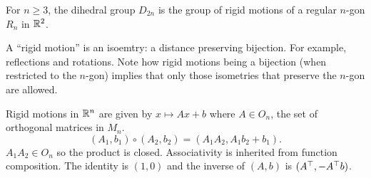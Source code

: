 \begin{definition} \label{def:groups:dihedral}
    For $n \ge 3$, the dihedral group $D_{2n}$ is the group of rigid
    motions of a regular $n$-gon $R_n$ in $\mathbb{R}^2$.
\end{definition}
\begin{remark}
    A ``rigid motion'' is an isoemtry: a distance preserving bijection.
    For example, reflections and rotations.
    Note how rigid motions being a bijection (when restricted to the
    $n$-gon) implies that only those isometries that preserve the
    $n$-gon are allowed.
\end{remark}
\begin{center}
\end{center}

Rigid motions in $\mathbb{R}^n$ are given by $x \mapsto Ax + b$ where $A \in O_n$,
the set of orthogonal matrices in $M_n$.
\[
    (A_1, b_1) \circ (A_2, b_2) = (A_1 A_2, A_1 b_2 + b_1).
\] $A_1 A_2 \in O_n$ so the product is closed.
Associativity is inherited from function composition.
The identity is $(1, 0)$ and the inverse of $(A, b)$ is $(A^\top, -A^\top b)$.

